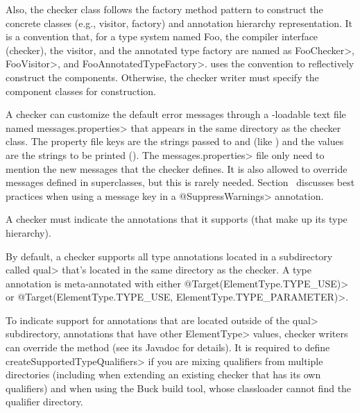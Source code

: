 Also, the checker class follows the factory method pattern to
construct the concrete classes (e.g., visitor, factory) and annotation
hierarchy representation.  It is a convention that, for
a type system named Foo, the compiler
interface (checker), the visitor, and the annotated type factory are
named as \<FooChecker>, \<FooVisitor>, and \<FooAnnotatedTypeFactory>.
 uses the convention to
reflectively construct the components.  Otherwise, the checker writer
must specify the component classes for construction.

\begin{sloppypar}
A checker can customize the default error messages through a
-loadable text file named
\<messages.properties> that appears in the same directory as the checker class.
The property file keys are the strings passed to 
and
(like ) and the values are the strings to be
printed ().
The \<messages.properties> file only need to mention the new messages that
the checker defines.
It is also allowed to override messages defined in superclasses, but this
is rarely needed.
Section~ discusses best practices
when using a message key in a \<@SuppressWarnings> annotation.
\end{sloppypar}


A checker must indicate the annotations that it supports (that make up its type
hierarchy).

By default, a checker supports all type annotations located in a
subdirectory called \<qual> that's located in the same directory as the checker.
A type annotation is meta-annotated with either
\<@Target(ElementType.TYPE\_USE)>
or
\<@Target({ElementType.TYPE\_USE, ElementType.TYPE\_PARAMETER})>.

To indicate support for annotations that are located outside of the \<qual>
subdirectory, annotations that have other \<ElementType> values,
checker writers can override the
method (see its Javadoc for details).
It is required to define \<createSupportedTypeQualifiers> if you are mixing
qualifiers from multiple directories (including when extending an existing
checker that has its own qualifiers) and when using the Buck build tool,
whose classloader cannot find the qualifier directory.

